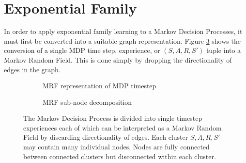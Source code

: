 \documentclass{article} %
\begin{document}
\section{Exponential Family}
In order to apply exponential family learning to a Markov Decision Processes, it must first be converted into a suitable graph representation. Figure \ref{fig:structure} shows the conversion of a single MDP time step, experience, or $(S,A,R,S')$ tuple into a Markov Random Field. This is done simply by dropping the directionality of edges in the graph.

\begin{figure}
  \centering
  \begin{subfigure}[b]{0.4\textwidth}
    \centering
    \caption{MRF representation of MDP timestep}
    \label{fig:mrf}
  \end{subfigure}
  \begin{subfigure}[b]{0.5\textwidth}
    \centering
    \caption{MRF sub-node decomposition}
    \label{fig:decomp}
  \end{subfigure}
  \caption{The Markov Decision Process is divided into single timestep experiences each of which can be interpreted as a Markov Random Field by discarding directionality of edges. Each cluster $S,A,R,S'$ may contain many individual nodes. Nodes are fully connected between connected clusters but disconnected within each cluster.}
  \label{fig:structure}
\end{figure}
\end{document}
